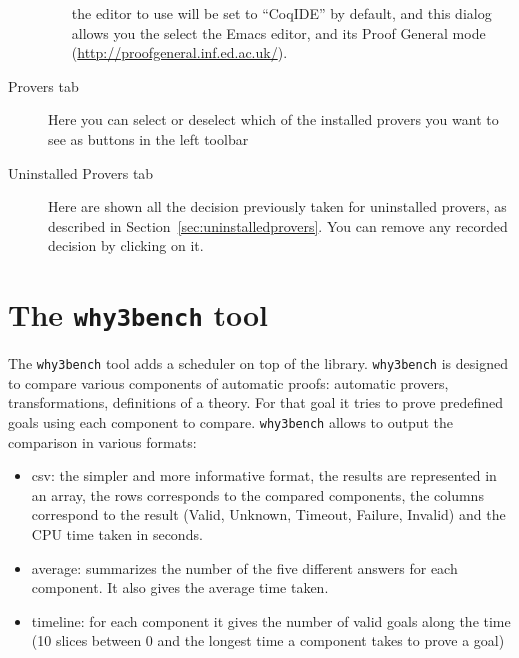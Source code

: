 \begin{description}
\begin{itemize}
  the editor to use will be set to ``CoqIDE'' by default, and this
  dialog allows you the select the Emacs editor, and its Proof General
  mode (\url{http://proofgeneral.inf.ed.ac.uk/}).
\end{itemize}
\item[\textsf{Provers} tab]
  Here you can select or deselect which of the installed provers you want to see
  as buttons in the left toolbar
\item[\textsf{Uninstalled Provers} tab] Here are shown all the
  decision previously taken for uninstalled provers, as described in
  Section~\ref{sec:uninstalledprovers}. You can remove any recorded
  decision by clicking on it.
\end{description}


\section{The \texttt{why3bench} tool}

The \texttt{why3bench} tool adds a scheduler on top of the \why
library. \texttt{why3bench} is designed to compare various components
of automatic proofs: automatic provers, transformations, definitions
of a theory. For that goal it tries to prove predefined goals using
each component to compare. \texttt{why3bench} allows to output the
comparison in various formats:
\begin{itemize}
\item csv: the simpler and more informative format, the results are
  represented in an array, the rows corresponds to the
  compared components, the columns correspond to the result
  (Valid, Unknown, Timeout, Failure, Invalid) and the CPU time taken in seconds.
\item average: summarizes the number of the five different answers
  for each component. It also gives the average time taken.
\item timeline: for each component it gives the number of valid goals
  along the time (10 slices between 0 and the longest time a component
  takes to prove a goal)
\end{itemize}

